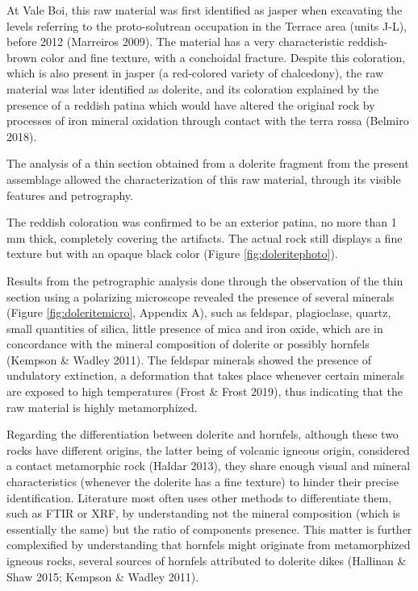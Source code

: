 \documentclass[12pt,twoside]{reedthesis}
\begin{document}
At Vale Boi, this raw material was first identified as jasper when excavating the levels referring to the proto-solutrean occupation in the Terrace area (units J-L), before 2012 (Marreiros 2009). The material has a very characteristic reddish-brown color and fine texture, with a conchoidal fracture. Despite this coloration, which is also present in jasper (a red-colored variety of chalcedony), the raw material was later identified as dolerite, and its coloration explained by the presence of a reddish patina which would have altered the original rock by processes of iron mineral oxidation through contact with the terra rossa (Belmiro 2018).

The analysis of a thin section obtained from a dolerite fragment from the present assemblage allowed the characterization of this raw material, through its visible features and petrography.

The reddish coloration was confirmed to be an exterior patina, no more than 1 mm thick, completely covering the artifacts. The actual rock still displays a fine texture but with an opaque black color (Figure \ref{fig:doleritephoto}).

Results from the petrographic analysis done through the observation of the thin section using a polarizing microscope revealed the presence of several minerals (Figure \ref{fig:doleritemicro}, Appendix A), such as feldspar, plagioclase, quartz, small quantities of silica, little presence of mica and iron oxide, which are in concordance with the mineral composition of dolerite or possibly hornfels (Kempson \& Wadley 2011). The feldspar minerals showed the presence of undulatory extinction, a deformation that takes place whenever certain minerals are exposed to high temperatures (Frost \& Frost 2019), thus indicating that the raw material is highly metamorphized.

Regarding the differentiation between dolerite and hornfels, although these two rocks have different origins, the latter being of volcanic igneous origin, considered a contact metamorphic rock (Haldar 2013), they share enough visual and mineral characteristics (whenever the dolerite has a fine texture) to hinder their precise identification. Literature most often uses other methods to differentiate them, such as FTIR or XRF, by understanding not the mineral composition (which is essentially the same) but the ratio of components presence. This matter is further complexified by understanding that hornfels might originate from metamorphized igneous rocks, several sources of hornfels attributed to dolerite dikes (Hallinan \& Shaw 2015; Kempson \& Wadley 2011).
\end{document}
